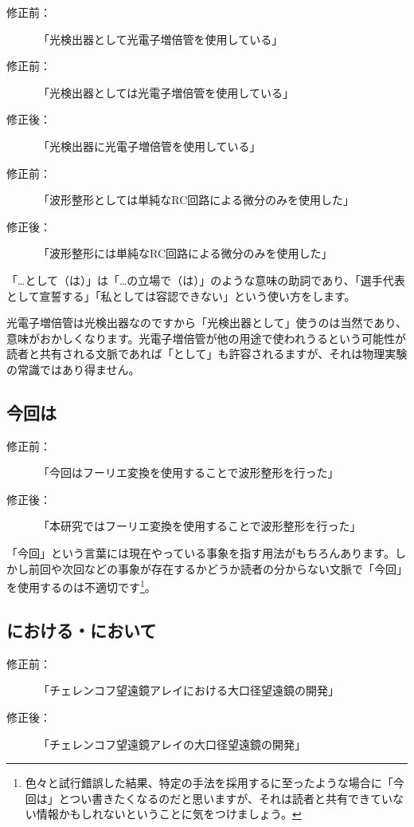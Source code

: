 \begin{description}
\item[修正前：]「光検出器として光電子増倍管を使用している」
\item[修正前：]「光検出器としては光電子増倍管を使用している」
\item[修正後：]「光検出器に光電子増倍管を使用している」
\end{description}

\begin{description}
\item[修正前：]「波形整形としては単純なRC回路による微分のみを使用した」
\item[修正後：]「波形整形には単純なRC回路による微分のみを使用した」
\end{description}

「…として（は）」は「…の立場で（は）」のような意味の助詞であり、「選手代表として宣誓する」「私としては容認できない」という使い方をします。

光電子増倍管は光検出器なのですから「光検出器として」使うのは当然であり、意味がおかしくなります。光電子増倍管が他の用途で使われうるという可能性が読者と共有される文脈であれば「として」も許容されるますが、それは物理実験の常識ではあり得ません。

\subsection{今回は}

\begin{description}
\item[修正前：]「今回はフーリエ変換を使用することで波形整形を行った」
\item[修正後：]「本研究ではフーリエ変換を使用することで波形整形を行った」
\end{description}

「今回」という言葉には現在やっている事象を指す用法がもちろんあります。しかし前回や次回などの事象が存在するかどうか読者の分からない文脈で「今回」を使用するのは不適切です\footnote{色々と試行錯誤した結果、特定の手法を採用するに至ったような場合に「今回は」とつい書きたくなるのだと思いますが、それは読者と共有できていない情報かもしれないということに気をつけましょう。}。

\subsection{における・において}

\begin{description}
\item[修正前：]「チェレンコフ望遠鏡アレイにおける大口径望遠鏡の開発」
\item[修正後：]「チェレンコフ望遠鏡アレイの大口径望遠鏡の開発」
\end{description}

